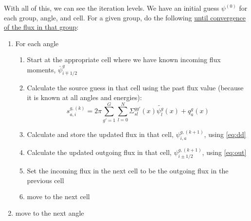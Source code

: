 \documentclass[12pt]{article}
\begin{document}
With all of this, we can see the iteration levels. We have an initial guess $\psi^{(0)}$ for each group, angle, and cell. For a given group, do the following \underline{until convergence of the flux in that group}:
\begin{enumerate}
\item For each angle
    \begin{enumerate}
    \item Start at the appropriate cell where we have known incoming flux moments, $\bar{\psi}_{i\mp1/2}^{g}$
    \item Calculate the source guess in that cell using the past flux value (because it is known at all angles and energies):
    \[
    s_{a,i}^{g,(k)} = 2\pi \sum_{g'=1}^G
  \sum_{l=0}^N \Sigma_{sl}^{gg'}(x) \tilde{\psi^g_l}(x) + q_{a}^g(x)
    \]
    \item Calculate and store the updated flux in that cell, $\psi_{i,a}^{g,(k+1)}$, using \autoref{eq:dd} 
    \item Calculate the updated outgoing flux in that cell, $\psi_{i\pm1/2}^{g,(k+1)}$, using \autoref{eq:out}
    \item Set the incoming flux in the next cell to be the outgoing flux in the previous cell
    \item move to the next cell
  \end{enumerate}
  \item move to the next angle
\end{enumerate}
\end{document}
